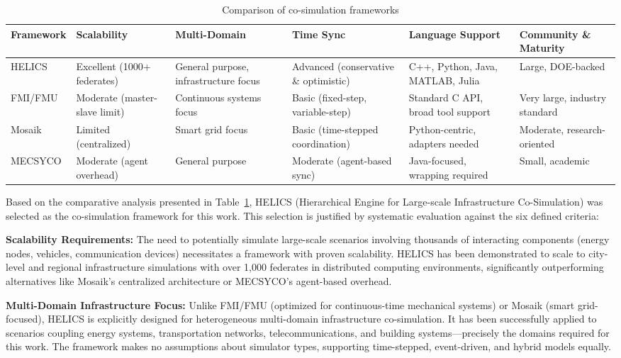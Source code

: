 \begin{table}[h]
    \centering
    \caption{Comparison of co-simulation frameworks}
    \label{tab:cosim_comparison}
    \begin{tabular}{|p{2cm}|p{2cm}|p{2cm}|p{2.3cm}|p{2.3cm}|p{2.3cm}|}
        \hline
        \textbf{Framework} & \textbf{Scalability} & \textbf{Multi-Domain} & \textbf{Time Sync} & \textbf{Language Support} & \textbf{Community \& Maturity} \\
        \hline
        HELICS & Excellent (1000+ federates) & General purpose, infrastructure focus & Advanced (conservative \& optimistic) & C++, Python, Java, MATLAB, Julia & Large, DOE-backed \\
        \hline
        FMI/FMU & Moderate (master-slave limit) & Continuous systems focus & Basic (fixed-step, variable-step) & Standard C API, broad tool support & Very large, industry standard \\
        \hline
        Mosaik & Limited (centralized) & Smart grid focus & Basic (time-stepped coordination) & Python-centric, adapters needed & Moderate, research-oriented \\
        \hline
        MECSYCO & Moderate (agent overhead) & General purpose & Moderate (agent-based sync) & Java-focused, wrapping required & Small, academic \\
        \hline
    \end{tabular}
\end{table}


Based on the comparative analysis presented in Table~\ref{tab:cosim_comparison}, HELICS (Hierarchical Engine for Large-scale Infrastructure Co-Simulation) was selected as the co-simulation framework for this work. This selection is justified by systematic evaluation against the six defined criteria:

\textbf{Scalability Requirements:} The need to potentially simulate large-scale scenarios involving thousands of interacting components (energy nodes, vehicles, communication devices) necessitates a framework with proven scalability. HELICS has been demonstrated to scale to city-level and regional infrastructure simulations with over 1,000 federates in distributed computing environments, significantly outperforming alternatives like Mosaik's centralized architecture or MECSYCO's agent-based overhead.

\textbf{Multi-Domain Infrastructure Focus:} Unlike FMI/FMU (optimized for continuous-time mechanical systems) or Mosaik (smart grid-focused), HELICS is explicitly designed for heterogeneous multi-domain infrastructure co-simulation. It has been successfully applied to scenarios coupling energy systems, transportation networks, telecommunications, and building systems—precisely the domains required for this work. The framework makes no assumptions about simulator types, supporting time-stepped, event-driven, and hybrid models equally.

